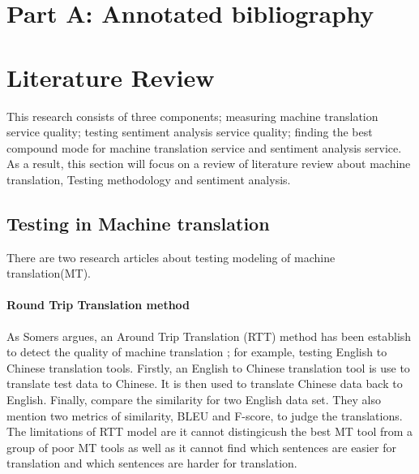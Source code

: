 \documentclass[conference]{IEEEtran}
\begin{document}
\section{Part A: Annotated bibliography}

\section{Literature Review}
This research consists of three components; measuring machine translation
service quality; testing sentiment analysis service quality;
finding the best compound mode for machine translation service and
sentiment analysis service.
As a result, this section will focus on a review of literature review about machine
translation, Testing methodology and sentiment analysis.
\subsection{Testing in Machine translation}
There are two research articles about testing modeling of machine
translation(MT).

\paragraph{Round Trip Translation method}
As Somers argues, an Around Trip Translation (RTT) method has been establish to
detect the quality of machine translation \cite{roundTripTranslation}; for example, testing English to Chinese translation tools.
Firstly, an English to Chinese translation tool is use to translate test data to
Chinese. It is then used to translate Chinese data back to English.
Finally, compare the similarity for two English data set.
They also mention two metrics of similarity, BLEU and F-score, to judge the
translations. The limitations of RTT model are it cannot distingicush the best
MT tool from a group of poor MT tools as well as it cannot find which sentences are easier for
translation and which sentences are harder for translation.
\end{document}
